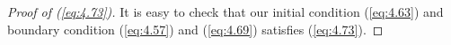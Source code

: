 \documentclass[table,a4paper,reqno]{amsart}
\numberwithin{equation}{section}
\theoremstyle{definition}
\begin{document}
\begin{proof}[Proof of (\ref{eq:4.73})]
    It is easy to check that our initial condition (\ref{eq:4.63}) and boundary condition (\ref{eq:4.57}) and (\ref{eq:4.69}) satisfies (\ref{eq:4.73}). 


\end{proof}
\end{document}
